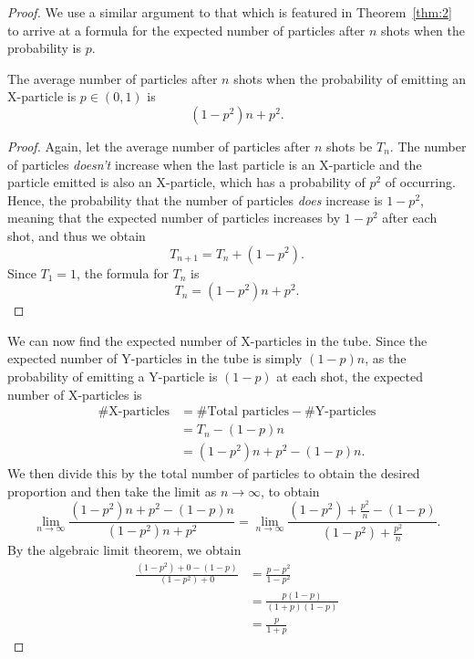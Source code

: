 \begin{proof}
  We use a similar argument to that which is featured in Theorem~\ref{thm:2} to arrive at a formula for the expected number of particles after $n$ shots when the probability is $p$.
  \begin{claim}
    The average number of particles after $n$ shots when the probability of emitting an X-particle is $p \in (0, 1)$ is \[
      (1-p^2)n + p^2
    .\] 
  \end{claim}
  \begin{proof}
    Again, let the average number of particles after $n$ shots be $T_n$. The number of particles \emph{doesn't} increase when the last particle is an X-particle and the particle emitted is also an X-particle, which has a probability of $p^2$ of occurring. Hence, the probability that the number of particles \emph{does} increase is $1-p^2$, meaning that the expected number of particles increases by $1-p^2$ after each shot, and thus we obtain \[
      T_{n+1} = T_{n} + (1-p^2)
    .\] Since $T_1 = 1$, the formula for $T_{n}$ is \[
      T_{n} = (1-p^2)n + p^2 \tag*{\qedhere}
    .\] 
  \end{proof}
  We can now find the expected number of X-particles in the tube. Since the expected number of Y-particles in the tube is simply $(1 - p)n$, as the probability of emitting a Y-particle is $(1-p)$ at each shot, the expected number of X-particles is 
  \begin{align*}
    \#\text{X-particles} &= \#\text{Total particles} - \#\text{Y-particles} \\
                         &= T_n - (1-p)n \\
                         &= (1-p^2)n + p^2 - (1-p)n.
  \end{align*}
  We then divide this by the total number of particles to obtain the desired proportion and then take the limit as $n \to \infty$, to obtain 
  \begin{equation*}
    \lim_{n \to \infty} \frac{(1-p^2)n + p^2 - (1-p)n}{(1-p^2)n + p^2} = \lim_{n \to \infty} \frac{(1-p^2) + \frac{p^2}{n} - (1-p)}{(1-p^2) + \frac{p^2}{n}}.
  \end{equation*}
  By the algebraic limit theorem, we obtain 
  \begin{align*}
    \frac{(1-p^2) + 0 - (1-p)}{(1-p^2) + 0} &= \frac{p - p^2}{1 - p^2} \\
                                                                &= \frac{p(1 - p)}{(1+p)(1-p)} \\
                                                                &= \frac{p}{1+p} \tag*{\qedhere}
  \end{align*}
\end{proof}
